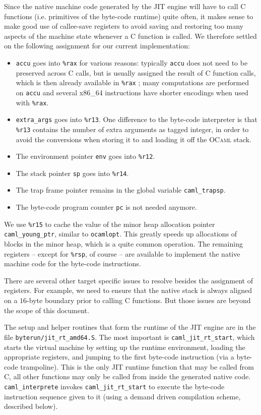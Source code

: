 \documentclass[10pt,a4paper,twocolumn]{article}
\begin{document}
Since the native machine code generated by the JIT engine will have to call C functions (i.e.
primitives of the byte-code runtime) quite often, it makes sense to make good use of callee-save
registers to avoid saving and restoring too many aspects of the machine state whenever a C function
is called. We therefore settled on the following assignment for our current implementation:
\begin{itemize}
\item \texttt{accu} goes into \texttt{\%rax} for various reasons: typically \texttt{accu} does not
  need to be preserved across C calls, but is usually assigned the result of C function calls, which
  is then already available in \texttt{\%rax} \cite{Matz10}; many computations are performed on
  \texttt{accu} and several x86\_64 instructions have shorter encodings when used with \texttt{\%rax}.
\item \texttt{extra\_args} goes into \texttt{\%r13}. One difference to the byte-code interpreter
  is that \texttt{\%r13} contains the number of extra arguments as tagged integer, in order to
  avoid the conversions when storing it to and loading it off the \textsc{OCaml} stack.
\item The environment pointer \texttt{env} goes into \texttt{\%r12}.
\item The stack pointer \texttt{sp} goes into \texttt{\%r14}.
\item The trap frame pointer remains in the global variable \texttt{caml\_trapsp}.
\item The byte-code program counter \texttt{pc} is not needed anymore.
\end{itemize}
We use \texttt{\%r15} to cache the value of the minor heap allocation pointer \texttt{caml\_young\_ptr},
similar to \texttt{ocamlopt}. This greatly speeds up allocations of blocks in the minor heap,
which is a quite common operation. The remaining registers -- except for \texttt{\%rsp}, of course --
are available to implement the native machine code for the byte-code instructions.

There are several other target specific issues to resolve besides the assignment of registers. For example,
we need to ensure that the native stack is always aligned on a $16$-byte boundary prior to calling C functions.
But those issues are beyond the scope of this document.

The setup and helper routines that form the runtime of the JIT engine are in the file
\texttt{byterun/jit\_rt\_amd64.S}. The most important is \texttt{caml\_jit\_rt\_start}, which
starts the virtual machine by setting up the runtime environment, loading the appropriate registers,
and jumping to the first byte-code instruction (via a byte-code trampoline). This is the only
JIT runtime function that may be called from C, all other functions may only be
called from inside the generated native code. \texttt{caml\_interprete} invokes \texttt{caml\_jit\_rt\_start}
to execute the byte-code instruction sequence given to it (using a demand driven compilation
scheme, described below).
\end{document}
